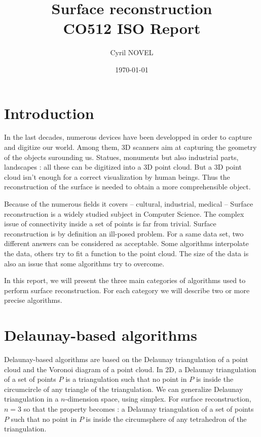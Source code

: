 \documentclass[12pt]{article}
\title{Surface reconstruction\\
\large{CO512 ISO Report}}
\author{Cyril NOVEL}
\date{\today}
\begin{document}
\maketitle
\newpage

\tableofcontents

\newpage

\section*{Introduction}
In the last decades, numerous devices have been developped in order to capture and digitize our world. Among them, 3D scanners aim at capturing the geometry of the objects surounding us. Statues, monuments but also industrial parts, landscapes : all these can be digitized into a 3D point cloud. But a 3D point cloud isn't enough for a correct visualization by human beings. Thus the reconstruction of the surface is needed to obtain a more comprehensible object.

Because of the numerous fields it covers -- cultural, industrial, medical -- Surface reconstruction is a widely studied subject in Computer Science. The complex issue of connectivity inside a set of points is far from trivial. Surface reconstruction is by definition an ill-posed problem. For a same data set, two different answers can be considered as acceptable. Some algorithms interpolate the data, others try to fit a function to the point cloud. The size of the data is also an issue that some algorithms try to overcome.

In this report, we will present the three main categories of algorithms used to perform surface reconstruction. For each category we will describe two or more precise algorithms.

\newpage

\section{Delaunay-based algorithms}
Delaunay-based algorithms are based on the Delaunay triangulation of a point cloud and the Voronoi diagram of a point cloud. In 2D, a Delaunay triangulation of a set of points $P$ is a triangulation such that no point in $P$ is inside the circumcircle of any triangle of the triangulation. We can generalize Delaunay triangulation in a $n$-dimension space, using simplex. For surface reconstruction, $n = 3$ so that the property becomes : a Delaunay triangulation of a set of points $P$ such that no point in $P$ is inside the circumsphere of any tetrahedron of the triangulation.
\end{document}

